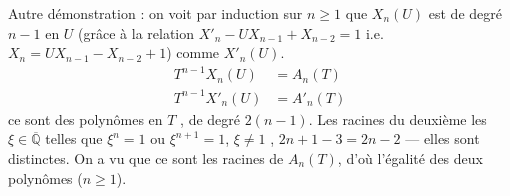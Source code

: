\documentclass[11pt,a4paper]{article}
\begin{document}
Autre démonstration : on voit par induction sur $n \geq 1$ que $X_n(U)$ est  de degré $n-1$ en $U$ (grâce à la relation $X'_n - U X_{n-1} + X_{n-2} = 1$ i.e.\ $X_n = U X_{n-1} - X_{n-2} + 1$) \struck{\ill{}}  comme $X'_n(U)$.  
\[
  \begin{aligned}
    T^{n-1} X_n(U) &= A_n(T)\\
    T^{n-1} X'_n(U) &= A'_n(T)
  \end{aligned}
\]
ce sont des polynômes \ill{}  en $T$  , de degré $2(n-1)$. Les racines du deuxième   les $\xi \in \overline{\mathbb{Q}}$ telles que $\xi^n = 1$ ou $\xi^{n+1} = 1$, $\xi \neq 1$ \struck{\ill{}},  $2n + 1 - 3 = 2n - 2$ — elles sont distinctes. On a vu que ce sont les racines de $A_n(T)$, d'où l'égalité des deux polynômes ($n \geq 1$).
\end{document}
